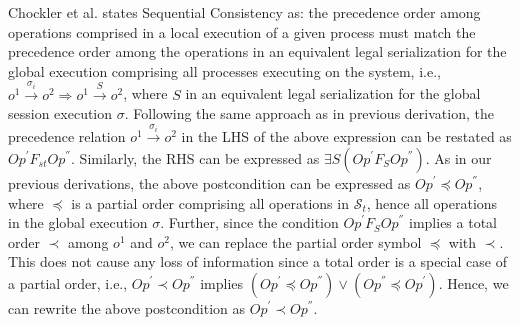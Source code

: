 \documentclass[acmlarge, ,11pt]{acmart}
\begin{document}
   \par Chockler et al. states Sequential Consistency as: the precedence order among operations comprised in a local execution of a given process must match the precedence order among the operations in an equivalent legal serialization for the global execution comprising all processes executing on the system, i.e.,  $\mathit{o}^1 \xrightarrow{\sigma_i} \mathit{o}^2 \Rightarrow \mathit{o}^1 \xrightarrow{S} \mathit{o}^2$, where $S$ in an equivalent legal serialization for the global session execution $\sigma$.  Following the same approach as in previous derivation, %
  the precedence relation $\mathit{o}^1 \xrightarrow{\sigma_i} \mathit{o}^2$ in the LHS of the above expression can be restated as
   $\mathit{Op}^{'} F_\mathit{st}  \mathit{Op}^{''}$.  %
   Similarly, the RHS can be expressed as $ \exists S \left( \mathit{Op}^{'} F_{S} \mathit{Op}^{''} \right)$. %
  As in our previous derivations, the above postcondition can be expressed as ${\mathit{Op}}^{'}  \preccurlyeq {\mathit{Op}}^{''}$, where $ \preccurlyeq$ is a partial order comprising all operations in $\mathcal{S}_t$, hence all operations in the global execution $\sigma$.  Further, since the condition ${\mathit{Op}}^{'}  F_{S} {\mathit{Op}}^{''} $ implies a total order $\prec$ among $\mathit{o}^1 $ and $\mathit{o}^2$, we can replace the partial order symbol $\preccurlyeq$ with $\prec$. This does not cause any loss of information since a total order is a special case of a partial order, i.e., ${\mathit{Op}}^{'}  \prec {\mathit{Op}}^{''}$  implies $\left( {\mathit{Op}}^{'} \preccurlyeq {\mathit{Op}}^{''} \right) \vee \left( {\mathit{Op}}^{''}  \preccurlyeq {\mathit{Op}}^{'}\right)$. Hence, we can rewrite the above postcondition as  ${\mathit{Op}}^{'}  \prec {\mathit{Op}}^{''} $.
\end{document}
